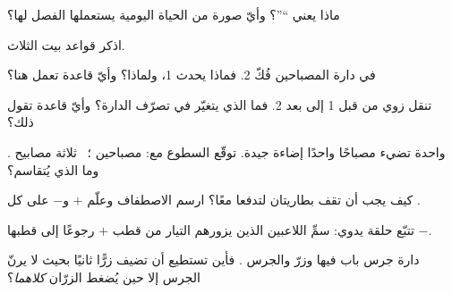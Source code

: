 \begin{exercise}[$\star$]\label{exo:g4:series-circuits:1}
ماذا يعني ``''؟ وأيّ صورة من الحياة اليومية يستعملها
الفصل لها؟
\end{exercise}

\begin{exercise}[$\star$]\label{exo:g4:series-circuits:2}
اذكر قواعد بيت  الثلاث.
\end{exercise}

\begin{exercise}[$\star$]\label{exo:g4:series-circuits:3}
في دارة المصباحين فُكّ  2. فماذا يحدث  1، ولماذا؟
وأيّ قاعدة تعمل هنا؟
\end{exercise}

\begin{exercise}[$\star$]\label{exo:g4:series-circuits:4}
تنقل زوي  من قبل  1 إلى بعد  2. فما الذي
يتغيّر في تصرّف الدارة؟ وأيّ قاعدة تقول ذلك؟
\end{exercise}

\begin{exercise}[$\star$]\label{exo:g4:series-circuits:5}
 واحدة تضيء مصباحًا واحدًا إضاءة جيدة. توقّع السطوع مع:
مصباحين ؛ \ ثلاثة مصابيح . وما الذي
يُتقاسم؟
\end{exercise}

\begin{exercise}[$\star$]\label{exo:g4:series-circuits:6}
كيف يجب أن تقف بطاريتان لتدفعا معًا؟ ارسم الاصطفاف وعلّم $+$
و$-$ على كل .
\end{exercise}

\begin{exercise}[$\star$]\label{exo:g4:series-circuits:7}
تتبّع حلقة  يدوي: سمِّ اللاعبين الذين يزورهم التيار من قطب
 $+$ رجوعًا إلى قطبها $-$.
\end{exercise}

\begin{exercise}[$\star$]\label{exo:g4:series-circuits:8}
دارة جرس باب فيها  وزرّ والجرس . فأين تستطيع أن
تضيف زرًّا ثانيًا بحيث لا يرنّ الجرس إلا حين يُضغط الزرّان
\emph{كلاهما}؟
\end{exercise}

